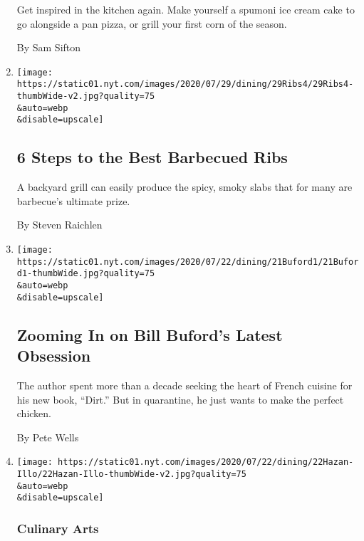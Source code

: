 \begin{enumerate}
  Get inspired in the kitchen again. Make yourself a spumoni ice cream
  cake to go alongside a pan pizza, or grill your first corn of the
  season.

  By Sam Sifton
\item
  \href{/2020/07/24/dining/bbq-ribs-recipe.html}{}

  \texttt{[image: https://static01.nyt.com/images/2020/07/29/dining/29Ribs4/29Ribs4-thumbWide-v2.jpg?quality=75\\\&auto=webp\\\&disable=upscale]}

  \hypertarget{6-steps-to-the-best-barbecued-ribs}{%
  \subsection{6 Steps to the Best Barbecued
  Ribs}\label{6-steps-to-the-best-barbecued-ribs}}

  A backyard grill can easily produce the spicy, smoky slabs that for
  many are barbecue's ultimate prize.

  By Steven Raichlen
\item
  \href{/2020/07/21/dining/bill-buford-dirt-book-chicken-recipe.html}{}

  \texttt{[image: https://static01.nyt.com/images/2020/07/22/dining/21Buford1/21Buford1-thumbWide.jpg?quality=75\\\&auto=webp\\\&disable=upscale]}

  \hypertarget{zooming-in-on-bill-bufords-latest-obsession}{%
  \subsection{Zooming In on Bill Buford's Latest
  Obsession}\label{zooming-in-on-bill-bufords-latest-obsession}}

  The author spent more than a decade seeking the heart of French
  cuisine for his new book, ``Dirt.'' But in quarantine, he just wants
  to make the perfect chicken.

  By Pete Wells
\item
  \href{/2020/07/20/dining/marcella-hazan-tomato-sauce-recipe.html}{}

  \texttt{[image: https://static01.nyt.com/images/2020/07/22/dining/22Hazan-Illo/22Hazan-Illo-thumbWide-v2.jpg?quality=75\\\&auto=webp\\\&disable=upscale]}

  \hypertarget{culinary-arts}{%
  \subsubsection{Culinary Arts}\label{culinary-arts}}


\end{enumerate}
